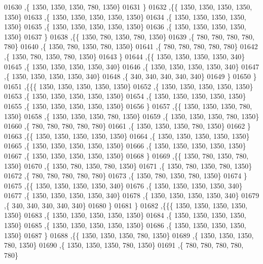 \begin{DoxyCode}
01630    ,\{  1350,  1350,  1350,   780,  1350\}
01631    \}
01632   ,\{\{  1350,  1350,  1350,  1350,  1350\}
01633    ,\{  1350,  1350,  1350,  1350,  1350\}
01634    ,\{  1350,  1350,  1350,  1350,  1350\}
01635    ,\{  1350,  1350,  1350,  1350,  1350\}
01636    ,\{  1350,  1350,  1350,  1350,  1350\}
01637    \}
01638   ,\{\{  1350,   780,  1350,   780,  1350\}
01639    ,\{   780,   780,   780,   780,   780\}
01640    ,\{  1350,   780,  1350,   780,  1350\}
01641    ,\{   780,   780,   780,   780,   780\}
01642    ,\{  1350,   780,  1350,   780,  1350\}
01643    \}
01644   ,\{\{  1350,  1350,  1350,  1350,   340\}
01645    ,\{  1350,  1350,  1350,  1350,   340\}
01646    ,\{  1350,  1350,  1350,  1350,   340\}
01647    ,\{  1350,  1350,  1350,  1350,   340\}
01648    ,\{   340,   340,   340,   340,   340\}
01649    \}
01650   \}
01651  ,\{\{\{  1350,  1350,  1350,  1350,  1350\}
01652    ,\{  1350,  1350,  1350,  1350,  1350\}
01653    ,\{  1350,  1350,  1350,  1350,  1350\}
01654    ,\{  1350,  1350,  1350,  1350,  1350\}
01655    ,\{  1350,  1350,  1350,  1350,  1350\}
01656    \}
01657   ,\{\{  1350,  1350,  1350,   780,  1350\}
01658    ,\{  1350,  1350,  1350,   780,  1350\}
01659    ,\{  1350,  1350,  1350,   780,  1350\}
01660    ,\{   780,   780,   780,   780,   780\}
01661    ,\{  1350,  1350,  1350,   780,  1350\}
01662    \}
01663   ,\{\{  1350,  1350,  1350,  1350,  1350\}
01664    ,\{  1350,  1350,  1350,  1350,  1350\}
01665    ,\{  1350,  1350,  1350,  1350,  1350\}
01666    ,\{  1350,  1350,  1350,  1350,  1350\}
01667    ,\{  1350,  1350,  1350,  1350,  1350\}
01668    \}
01669   ,\{\{  1350,   780,  1350,   780,  1350\}
01670    ,\{  1350,   780,  1350,   780,  1350\}
01671    ,\{  1350,   780,  1350,   780,  1350\}
01672    ,\{   780,   780,   780,   780,   780\}
01673    ,\{  1350,   780,  1350,   780,  1350\}
01674    \}
01675   ,\{\{  1350,  1350,  1350,  1350,   340\}
01676    ,\{  1350,  1350,  1350,  1350,   340\}
01677    ,\{  1350,  1350,  1350,  1350,   340\}
01678    ,\{  1350,  1350,  1350,  1350,   340\}
01679    ,\{   340,   340,   340,   340,   340\}
01680    \}
01681   \}
01682  ,\{\{\{  1350,  1350,  1350,  1350,  1350\}
01683    ,\{  1350,  1350,  1350,  1350,  1350\}
01684    ,\{  1350,  1350,  1350,  1350,  1350\}
01685    ,\{  1350,  1350,  1350,  1350,  1350\}
01686    ,\{  1350,  1350,  1350,  1350,  1350\}
01687    \}
01688   ,\{\{  1350,  1350,  1350,   780,  1350\}
01689    ,\{  1350,  1350,  1350,   780,  1350\}
01690    ,\{  1350,  1350,  1350,   780,  1350\}
01691    ,\{   780,   780,   780,   780,   780\}

\end{DoxyCode}
